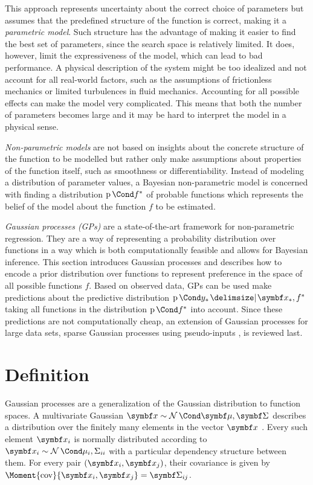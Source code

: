 This approach represents uncertainty about the correct choice of parameters but assumes that the predefined structure of the function is correct, making it a \emph{parametric model}.
Such structure has the advantage of making it easier to find the best set of parameters, since the search space is relatively limited.
It does, however, limit the expressiveness of the model, which can lead to bad performance.
A physical description of the system might be too idealized and not account for all real-world factors, such as the assumptions of frictionless mechanics or limited turbulences in fluid mechanics.
Accounting for all possible effects can make the model very complicated.
This means that both the number of parameters becomes large and it may be hard to interpret the model in a physical sense.

\emph{Non-parametric models} are not based on insights about the concrete structure of the function to be modelled but rather only make assumptions about properties of the function itself, such as smoothness or differentiability.
Instead of modeling a distribution of parameter values, a Bayesian non-parametric model is concerned with finding a distribution $\Prob{f^\ast}$ of probable functions which represents the belief of the model about the function $f$ to be estimated.

\emph{Gaussian processes (GPs)} are a state-of-the-art framework for non-parametric regression.
They are a way of representing a probability distribution over functions in a way which is both computationally feasible and allows for Bayesian inference.
This section introduces Gaussian processes and describes how to encode a prior distribution over functions to represent preference in the space of all possible functions $f$.
Based on observed data, GPs can be used make predictions about the predictive distribution $\Prob{y_\ast \given \mat{x_\ast}, f^\ast}$ taking all functions in the distribution $\Prob{f^\ast}$ into account.
Since these predictions are not computationally cheap, an extension of Gaussian processes for large data sets, sparse Gaussian processes using pseudo-inputs \cite{snelson_sparse_2005}, is reviewed last.

\section{Definition}
Gaussian processes are a generalization of the Gaussian distribution to function spaces.
A multivariate Gaussian $\mat{x} \sim \Gaussian{\mat{\mu}, \mat{\Sigma}}$ describes a distribution over the finitely many elements in the vector $\mat{x}$ \cite{gauss_theoria_1809}.
Every such element $\rv{x_i}$ is normally distributed according to $\rv{x_i} \sim \Gaussian{\mu_i, \Sigma_{ii}}$ with a particular dependency structure between them.
For every pair $(\rv{x_i}, \rv{x_j})$, their covariance is given by $\Moment{\cov}{\rv{x_i}, \rv{x_j}} = \mat{\Sigma}_{ij}$.

